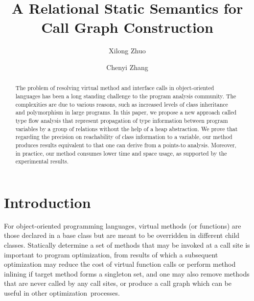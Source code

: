 \documentclass{llncs}
\begin{document}
%
\title{A Relational Static Semantics for Call Graph Construction}
%
%
\author{Xilong Zhuo \and Chenyi Zhang}
%
%
%

\maketitle              %
%
\begin{abstract}
The problem of resolving virtual method and interface calls in object-oriented languages has been a long standing challenge to the program analysis community. The complexities are due to various reasons, such as increased levels of class inheritance and polymorphism in large programs. In this paper, we propose a new approach called type flow analysis that represent propagation of type information between program variables by a group of relations without the help of a heap abstraction. We prove that regarding the precision on reachability of class information to a variable, our method produces results equivalent to that one can derive from a points-to analysis. Moreover, in practice, our method consumes lower time and space usage, as supported by the experimental results.

\end{abstract}
%
%
%

\section{Introduction}\label{sec:introduction}

For object-oriented programming languages, virtual methods (or functions) are those declared in a base class but are meant to be overridden in different child classes. Statically determine a set of methods that may be invoked at a call site is important to program optimization, from results of which a subsequent optimization may reduce the cost of virtual function calls or perform method inlining if target method forms a singleton set, and one may also remove methods that are never called by any call sites, or produce a call graph which can be useful in other optimization~processes.
\end{document}
